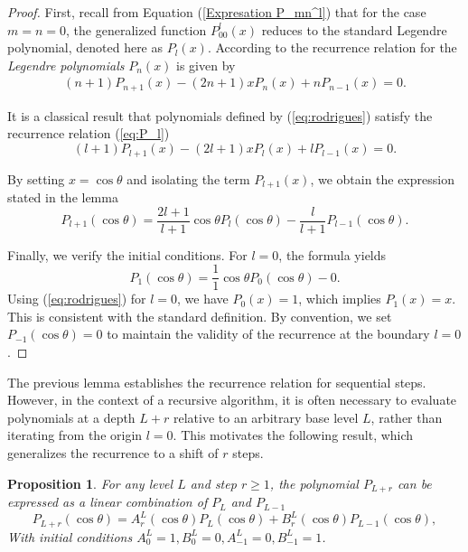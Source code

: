 \documentclass[11pt]{article}
\renewcommand\eqref[1]{(\ref{#1})} %
\newtheorem{prop}[thm]{Proposition}
\theoremstyle{definition}
\theoremstyle{remark}
\numberwithin{equation}{section}
\begin{document}
\begin{proof}
    First, recall from Equation \eqref{Expresation P_mn^l} that for the case $m=n=0$, the generalized function $P^l_{00}(x)$ reduces to the standard Legendre polynomial, denoted here as $P_l(x)$. According to the recurrence relation for the \textit{Legendre polynomials} $P_n(x)$ is given by
\begin{align}\label{eq:rodrigues}
(n+1) P_{n+1}(x) - (2n+1)x P_n(x) + n P_{n-1}(x) = 0.
\end{align}
    
    It is a classical result that polynomials defined by \eqref{eq:rodrigues} satisfy the recurrence relation \eqref{eq:P_l}
    \begin{equation} 
        (l+1) P_{l+1}(x) - (2l+1)x P_l(x) + l P_{l-1}(x) = 0.
    \end{equation}
    
    By setting $x = \cos\theta$ and isolating the term $P_{l+1}(x)$, we obtain the expression stated in the lemma
    \[
        P_{l+1}(\cos\theta) = \frac{2l+1}{l+1} \cos\theta P_l(\cos\theta) - \frac{l}{l+1} P_{l-1}(\cos\theta).
    \]
    
    Finally, we verify the initial conditions. For $l=0$, the formula yields
    \[
        P_1(\cos\theta) = \frac{1}{1} \cos\theta P_0(\cos\theta) - 0.
    \]
    Using \eqref{eq:rodrigues} for $l=0$, we have $P_0(x) = 1$, which implies $P_1(x) = x$. This is consistent with the standard definition. By convention, we set $P_{-1}(\cos\theta) = 0$ to maintain the validity of the recurrence at the boundary $l=0$.
\end{proof}

The previous lemma establishes the recurrence relation for sequential steps. However, in the context of a recursive algorithm, it is often necessary to evaluate polynomials at a depth $L+r$ relative to an arbitrary base level $L$, rather than iterating from the origin $l=0$. This motivates the following result, which generalizes the recurrence to a shift of $r$ steps.

\begin{prop}
For any level $L$ and step $r \geq 1$, the polynomial $P_{L+r}$ can be expressed as a linear combination of $P_L$ and $P_{L-1}$
\begin{equation}\label{CAP6-8}
P_{L+r}(\cos\theta) = A_r^L(\cos\theta) P_L(\cos\theta) + B_r^L(\cos\theta) P_{L-1}(\cos\theta),
\end{equation}
With initial conditions $A_0^L=1, B_0^L=0, A_{-1}^L=0, B_{-1}^L=1$.
\end{prop}
\end{document}
